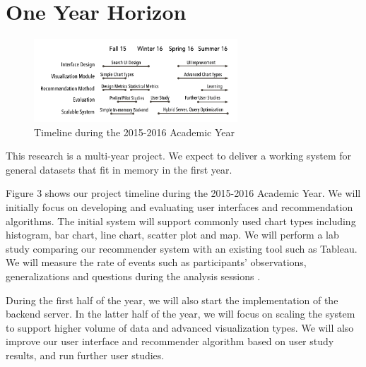 \section*{One Year Horizon}

\begingroup
\setlength{\columnsep}{16pt}

\begin{figure}
\vspace{-0.4in}

  \includegraphics[width=3in]{gantt-chart.png}
  \vspace{-0.3in}
  \caption{Timeline during the 2015-2016 Academic Year}

\label{fig:plan}
\vspace{-0.1in}
\end{figure}


This research is a multi-year project.  We expect to deliver a working system for general datasets that fit in memory in the first year.

Figure 3 shows our project timeline during the 2015-2016 Academic Year.
We will initially focus on developing and evaluating user interfaces and recommendation algorithms.   The initial system will support commonly used chart types including histogram, bar chart, line chart, scatter plot and map.  We will perform a lab study comparing our recommender system with an existing tool such as Tableau.  We will measure the rate of events such as participants’ observations, generalizations and questions during the analysis sessions \cite{liu:latency}.

\endgroup

During the first half of the year, we will also start the implementation of the backend server.  In the latter half of the year, we will focus on scaling the system to support higher volume of data and advanced visualization types. We will also improve our user interface and recommender algorithm based on user study results, and run further user studies.


